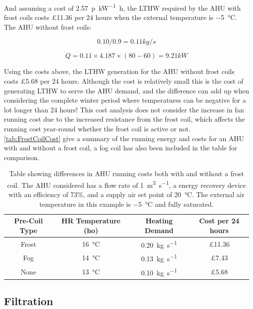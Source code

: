 And assuming a cost of \SI{2.57}{p\per\kilo\watt\hour}, the LTHW required by the AHU with frost coils costs £11.36 per 24 hours when the external temperature is \SI{-5}{\celsius}.  The AHU without frost coils:

\begin{equation}
0.10 / 0.9 = 0.11 kg/s
\end{equation}

\begin{equation}
Q = 0.11 \times 4.187 \times (80-60) = 9.21 kW
\end{equation}

Using the costs above, the LTHW generation for the AHU without frost coils costs £5.68 per 24 hours.  Although the cost is relatively small this is the cost of generating LTHW to serve the AHU demand, and the  difference can add up when considering the complete winter period where temperatures can be negative for a lot longer than 24 hours!  This cost analysis does not consider the increase in fan running cost due to the increased resistance from the frost coil, which affects the running cost year-round whether the frost coil is active or not.  \autoref{tab:FrostCoilCost} give a summary of the running energy and costs for an AHU with and without a frost coil, a fog coil has also been included in the table for comparison.

\begin{table}
\centering
\begin{tabular}{cccc}
\hline
Pre-Coil Type & HR Temperature (ho) & Heating Demand & Cost per 24 hours\\
\hline
Frost & \SI{16}{\celsius} & \SI{0.20}{\kilo\gram\per\second} & \pounds11.36 \\
Fog & \SI{14}{\celsius} & \SI{0.13}{\kilo\gram\per\second} & \pounds7.43 \\
None & \SI{13}{\celsius} & \SI{0.10}{\kilo\gram\per\second} & \pounds5.68 \\
\hline
\end{tabular}
\caption{Table showing differences in AHU running costs both with and without a frost coil.  The AHU considered has a flow rate of \SI{1}{\cubic\metre\per\second}, a energy recovery device with an efficiency of 73\%, and a supply air set point of \SI{20}{\celsius}.  The external air temperature in this example is \SI{-5}{\celsius} and fully saturated.}
\label{tab:FrostCoilCost}
\end{table}

\subsection{Filtration}



